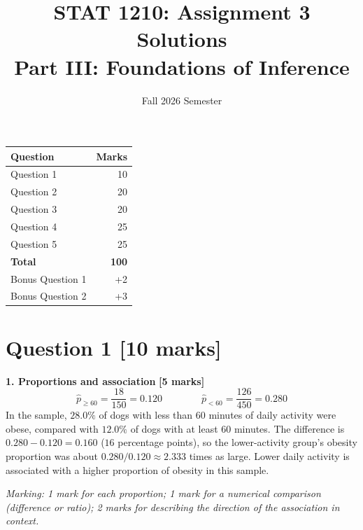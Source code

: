 \documentclass[10pt,letterpaper]{article}
\title{STAT 1210: Assignment 3 Solutions\\[4pt]
\large Part III: Foundations of Inference}
\author{Fall 2026 Semester}
\date{}
\newcommand{\partmarks}[1]{\hfill\textbf{[#1 marks]}}
\newcommand{\allocation}[1]{\par\smallskip\textit{Marking: #1}\par}
\begin{document}
\maketitle

\begin{center}
\begin{tabular}{lr}
\toprule
\textbf{Question} & \textbf{Marks} \\
\midrule
Question 1 & 10 \\
Question 2 & 20 \\
Question 3 & 20 \\
Question 4 & 25 \\
Question 5 & 25 \\
\midrule
\textbf{Total} & \textbf{100} \\
\midrule
Bonus Question 1 & +2 \\
Bonus Question 2 & +3 \\
\bottomrule
\end{tabular}
\end{center}

\newpage

\section*{Question 1 \hfill [10 marks]}

\textbf{1. Proportions and association} \partmarks{5}
$$\hat p_{\ge 60}=\frac{18}{150}=0.120 \qquad\qquad \hat p_{<60}=\frac{126}{450}=0.280$$
In the sample, $28.0\%$ of dogs with less than $60$ minutes of daily activity were obese, compared with $12.0\%$ of dogs with at least $60$ minutes. The difference is $0.280-0.120=0.160$ ($16$ percentage points), so the lower-activity group's obesity proportion was about $0.280/0.120\approx2.333$ times as large. Lower daily activity is associated with a higher proportion of obesity in this sample.

\allocation{1 mark for each proportion; 1 mark for a numerical comparison (difference or ratio); 2 marks for describing the direction of the association in context.}
\end{document}
